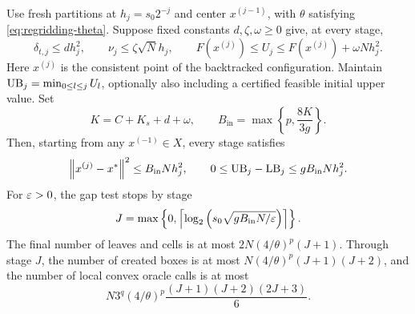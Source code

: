\begin{theorem}
 \label{thm:inexact-main}
Use fresh partitions at $h_j=s_0 2^{-j}$ and center $x^{(j-1)}$, with
$\theta$ satisfying \eqref{eq:regridding-theta}.  Suppose fixed
constants $d,\zeta,\omega\ge0$ give, at every stage,
\begin{equation}
 \delta_{t,j}\le d h_j^2,\qquad
 \nu_j\le\zeta\sqrt N h_j,\qquad
 F(x^{(j)})\le U_j\le F(x^{(j)})+\omega Nh_j^2.
 \label{eq:inexact-budgets}
\end{equation}
Here $x^{(j)}$ is the consistent point of the backtracked configuration.
Maintain $\mathrm{UB}_j=\min_{0\le l\le j}U_l$, optionally also including a
certified feasible initial upper value.  Set
\begin{equation}
 K=C+K_s+d+\omega,\qquad
 B_{\mathrm{in}}=\max\left\{p,\frac{8K}{3g}\right\}.
 \label{eq:inexact-constants}
\end{equation}
Then, starting from any $x^{(-1)}\in X$, every stage satisfies
\begin{equation}
 \left\lVert x^{(j)}-x^*\right\rVert^2\le B_{\mathrm{in}}Nh_j^2,
 \qquad
 0\le\mathrm{UB}_j-\mathrm{LB}_j\le gB_{\mathrm{in}}Nh_j^2.
 \label{eq:inexact-stage-bounds}
\end{equation}
For $\varepsilon>0$, the gap test stops by stage
\[
 J=\max\left\{0,\left\lceil \log_2\left(
               s_0\sqrt{gB_{\mathrm{in}}N/\varepsilon}\right)\right\rceil\right\}.
\]
The final number of leaves and cells is at most
$2N(4/\theta)^p(J+1)$.  Through stage $J$, the number of created boxes
is at most $N(4/\theta)^p(J+1)(J+2)$, and the number of local convex
oracle calls is at most
\[
 N3^q(4/\theta)^p\frac{(J+1)(J+2)(2J+3)}6.
\]
\end{theorem}

